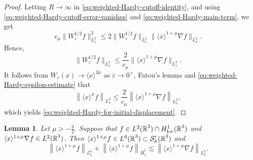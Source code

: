 \documentclass[11pt,twoside]{article}
\def\R{\mathop{\mathbb R\kern 0pt}\nolimits}
\def\f{\frac}
\def\ls{\lesssim}
\theoremstyle{plain}
\newtheorem{lemma}[theorem]{Lemma}
\theoremstyle{definition}
\theoremstyle{assumption}
\numberwithin{equation}{section}
\begin{document}
\begin{proof}
		Letting \(R\to\infty\) in
		\eqref{eq:weighted-Hardy-cutoff-identity}, and using
		\eqref{eq:weighted-Hardy-cutoff-error-vanishes} and
		\eqref{eq:weighted-Hardy-main-term}, we get
		\[
		c_\mu
		\big\|
		W_\varepsilon^{1/2}f
		\big\|_{L^2_x}^2
		\le
		2
		\big\|
		W_\varepsilon^{1/2}f
		\big\|_{L^2_x}
		\big\|
		\langle x\rangle^{1+\mu}
		\nabla f
		\big\|_{L^2_x}.
		\]
		Hence,
		\begin{equation}
			\label{eq:weighted-Hardy-epsilon-estimate}
			\big\|
			W_\varepsilon^{1/2}f
			\big\|_{L^2_x}
			\le
			\frac{2}{c_\mu}
			\big\|
			\langle x\rangle^{1+\mu}
			\nabla f
			\big\|_{L^2_x}.
		\end{equation}
		It follows from
		$W_\varepsilon(x)\to\langle x\rangle^{2\mu}$
		as 	$\varepsilon\to0^+$,
		Fatou's lemma and \eqref{eq:weighted-Hardy-epsilon-estimate} that
		\[
		\left\|
		\langle x\rangle^\mu f
		\right\|_{L^2_x}
		\le
		\frac{2}{c_\mu}
		\left\|
		\langle x\rangle^{1+\mu}
		\nabla f
		\right\|_{L^2_x},
		\]
		which yields \eqref{eq:weighted-Hardy-for-initial-displacement}.
	\end{proof}
	
	
	
	

	
	
	
	
	\begin{lemma}
		\label{lem:weighted-data-in-Sh}
		Let $\mu>-\f32$. Suppose that
		$f\in L^2(\R^3)\cap H^1_{\mathrm{loc}}(\R^3)$
		and $\langle x\rangle^{1+\mu}\nabla f\in L^2(\R^3)$.
		Then $\langle x\rangle^{1+\mu}f\in
			L^6(\R^3)\subset\mathcal S'_h(\R^3)$
		and
		\begin{equation}
			\label{eq:weighted-data-L6-estimate}
			\left\|
			\langle x\rangle^{1+\mu}f
			\right\|_{L^6_x}
			+
			\left\|
			\langle x\rangle^{1+\mu}f
			\right\|_{\dot{H}^1_x}
			\ls
			\left\|
			\langle x\rangle^{1+\mu}\nabla f
			\right\|_{L^2_x}.
		\end{equation}
	\end{lemma}
	
\end{document}
